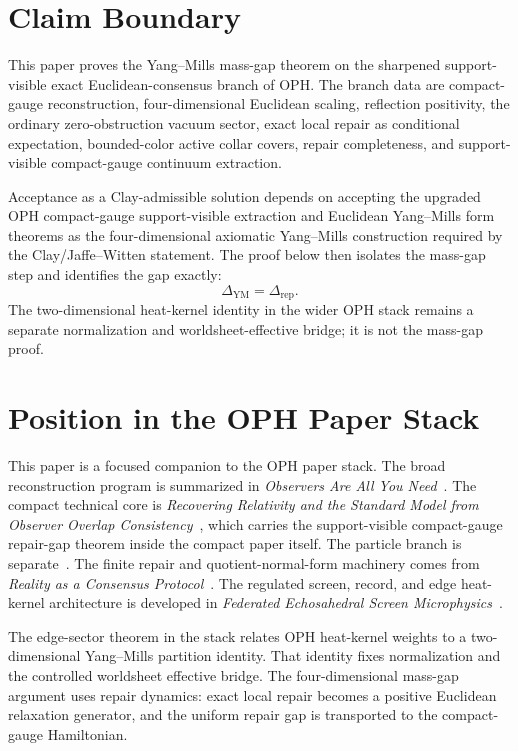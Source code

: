 \documentclass[11pt]{article}
\numberwithin{equation}{section}
\theoremstyle{remark}
\newcommand{\YM}{\mathrm{YM}}
\begin{document}
\section{Claim Boundary}

This paper proves the Yang--Mills mass-gap theorem on the sharpened support-visible exact
Euclidean-consensus branch of OPH. The branch data are compact-gauge reconstruction,
four-dimensional Euclidean scaling, reflection positivity, the ordinary zero-obstruction vacuum
sector, exact local repair as conditional expectation, bounded-color active collar covers,
repair completeness, and support-visible compact-gauge continuum extraction.

Acceptance as a Clay-admissible solution depends on accepting the upgraded OPH compact-gauge
support-visible extraction and Euclidean Yang--Mills form theorems as the four-dimensional
axiomatic Yang--Mills construction required by the Clay/Jaffe--Witten statement. The proof below
then isolates the mass-gap step and identifies the gap exactly:
\[
\Delta_{\YM}=\Delta_{\mathrm{rep}}.
\]
The two-dimensional heat-kernel identity in the wider OPH stack remains a separate normalization
and worldsheet-effective bridge; it is not the mass-gap proof.

\section{Position in the OPH Paper Stack}

This paper is a focused companion to the OPH paper stack. The broad reconstruction program is
summarized in \emph{Observers Are All You Need}~\cite{oph1}. The compact technical core is
\emph{Recovering Relativity and the Standard Model from Observer Overlap Consistency}~\cite{oph2},
which carries the support-visible compact-gauge repair-gap theorem inside the compact paper
itself. The particle branch is separate~\cite{oph3}. The finite repair and quotient-normal-form
machinery comes from \emph{Reality as a Consensus Protocol}~\cite{oph4}. The regulated screen,
record, and edge heat-kernel architecture is developed in \emph{Federated Echosahedral Screen
Microphysics}~\cite{oph5}.

The edge-sector theorem in the stack relates OPH heat-kernel weights to a two-dimensional
Yang--Mills partition identity. That identity fixes normalization and the controlled worldsheet
effective bridge. The four-dimensional mass-gap argument uses repair dynamics: exact local repair
becomes a positive Euclidean relaxation generator, and the uniform repair gap is transported to the
compact-gauge Hamiltonian.
\end{document}
